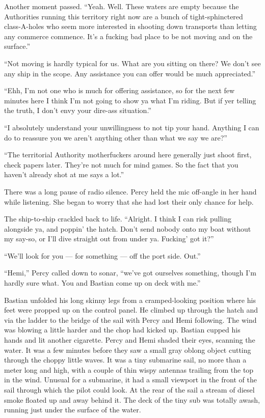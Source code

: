\documentclass[
]{scrbook}
\begin{document}
Another moment passed. ``Yeah. Well. These waters are empty because the
Authorities running this territory right now are a bunch of
tight-sphinctered class-A-holes who seem more interested in shooting
down transports than letting any commerce commence. It's a fucking bad
place to be not moving and on the surface.''

``Not moving is hardly typical for us. What are you sitting on there? We
don't see any ship in the scope. Any assistance you can offer would be
much appreciated.''

``Ehh, I'm not one who is much for offering assistance, so for the next
few minutes here I think I'm not going to show ya what I'm riding. But
if yer telling the truth, I don't envy your dire-ass situation.''

``I absolutely understand your unwillingness to not tip your hand.
Anything I can do to reassure you we aren't anything other than what we
say we are?''

``The territorial Authority motherfuckers around here generally just
shoot first, check papers later. They're not much for mind games. So the
fact that you haven't already shot at me says a lot.''

There was a long pause of radio silence. Percy held the mic off-angle in
her hand while listening. She began to worry that she had lost their
only chance for help.

The ship-to-ship crackled back to life. ``Alright. I think I can risk
pulling alongside ya, and poppin' the hatch. Don't send nobody onto my
boat without my say-so, or I'll dive straight out from under ya.
Fucking' got it?''

``We'll look for you --- for something --- off the port side. Out.''

\bigskip

``Hemi,'' Percy called down to sonar, ``we've got ourselves something,
though I'm hardly sure what. You and Bastian come up on deck with me.''

Bastian unfolded his long skinny legs from a cramped-looking position
where his feet were propped up on the control panel. He climbed up
through the hatch and via the ladder to the bridge of the sail with
Percy and Hemi following. The wind was blowing a little harder and the
chop had kicked up. Bastian cupped his hands and lit another cigarette.
Percy and Hemi shaded their eyes, scanning the water. It was a few
minutes before they saw a small gray oblong object cutting through the
choppy little waves. It was a tiny submarine sail, no more than a meter
long and high, with a couple of thin wispy antennas trailing from the
top in the wind. Unusual for a submarine, it had a small viewport in the
front of the sail through which the pilot could look. At the rear of the
sail a stream of diesel smoke floated up and away behind it. The deck of
the tiny sub was totally awash, running just under the surface of the
water.
\end{document}
